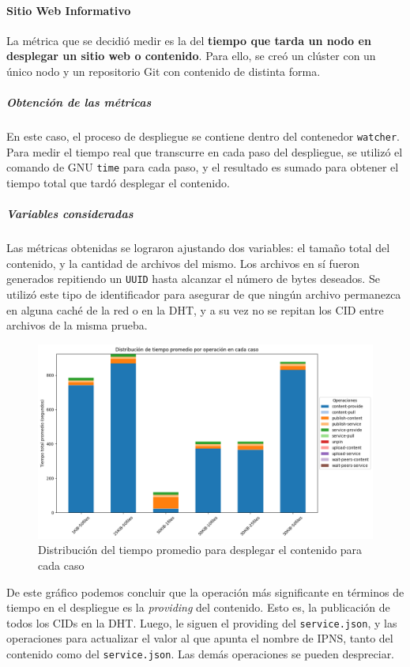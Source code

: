 \paragraph{Sitio Web Informativo}
La métrica que se decidió medir es la del \textbf{tiempo que tarda un nodo en desplegar un sitio web o contenido}. Para ello, se creó un clúster con un único nodo y un repositorio Git con contenido de distinta forma.

\subparagraph{Obtención de las métricas} En este caso, el proceso de despliegue se contiene dentro del contenedor \texttt{watcher}. Para medir el tiempo real que transcurre en cada paso del despliegue, se utilizó el comando de GNU \texttt{time} para cada paso, y el resultado es sumado para obtener el tiempo total que tardó desplegar el contenido.

\subparagraph{Variables consideradas} Las métricas obtenidas se lograron ajustando dos variables: el tamaño total del contenido, y la cantidad de archivos del mismo. Los archivos en sí fueron generados repitiendo un \texttt{UUID} hasta alcanzar el número de bytes deseados. Se utilizó este tipo de identificador para asegurar de que ningún archivo permanezca en alguna caché de la red o en la DHT, y a su vez no se repitan los CID entre archivos de la misma prueba.

\begin{figure}[H]
    \centering
    \includegraphics[width=1\linewidth]{img/metricas-ipfs/metricas-ipfs-caso1-1.png}
    \caption{Distribución del tiempo promedio para desplegar el contenido para cada caso}
    \label{fig:metricas-ipfs-caso1-1.png}
\end{figure}

De este gráfico podemos concluir que la operación más significante en términos de tiempo en el despliegue es la \textit{providing} del contenido. Esto es, la publicación de todos los CIDs en la DHT. Luego, le siguen el providing del \texttt{service.json}, y las operaciones para actualizar el valor al que apunta el nombre de IPNS, tanto del contenido como del \texttt{service.json}. Las demás operaciones se pueden despreciar.



